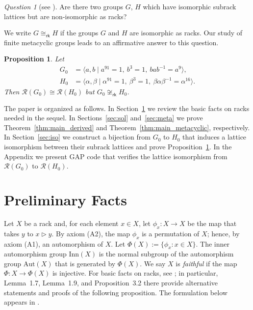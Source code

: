 \documentclass[a4paper,12pt]{article}
\newtheorem{prop}[thm]{Proposition}
\theoremstyle{definition}
\theoremstyle{remark}
\newtheorem*{question}{Question}
\begin{document}
\begin{question}[see {\cite[Question~5.2]{HSW19}}]\label{que:5.2}
  Are there two groups $G$, $H$ which have isomorphic subrack lattices but are non-isomorphic as racks?
\end{question}

We write $G\cong_{\mathsf{rk}}H$ if the groups $G$ and $H$ are isomorphic as racks. Our study of finite metacyclic groups leads to an affirmative answer to this question.

\begin{prop}\label{prop:ex}
  Let
  \begin{align*}
    G_0 &= \langle a,b\mid a^{91} = 1,\ b^3 = 1,\ bab^{-1} = a^9\rangle, \\
    H_0 &= \langle \alpha,\beta\mid \alpha^{91} = 1,\ \beta^3 = 1,\ \beta\alpha\beta^{-1} = \alpha^{16}\rangle.
  \end{align*}
  Then $\mathcal{R}(G_0)\cong \mathcal{R}(H_0)$ but $G_0\not\cong_{\mathsf{rk}}H_0$.
\end{prop}


The paper is organized as follows. In Section~\ref{sec:pre} we review the basic facts on racks needed in the sequel. In Sections~\ref{sec:sol} and~\ref{sec:meta} we prove Theorem~\ref{thm:main_derived} and Theorem~\ref{thm:main_metacyclic}, respectively. In Section~\ref{sec:iso} we construct a bijection from $G_0$ to $H_0$ that induces a lattice isomorphism between their subrack lattices and prove Proposition~\ref{prop:ex}. In the Appendix we present GAP code \cite{GAP4} that verifies the lattice isomorphism from $\mathcal{R}(G_0)$ to $\mathcal{R}(H_0)$.


\section{Preliminary Facts}\label{sec:pre}

Let $X$ be a rack and, for each element $x\in X$, let $\phi_x\colon X\to X$ be the map that takes $y$ to $x\triangleright y$. By axiom (A2), the map $\phi_x$ is a permutation of $X$; hence, by axiom (A1), an automorphism of $X$. Let $\Phi(X) := \{\phi_x\colon x\in X\}$. The inner automorphism group $\mathrm{Inn}(X)$ is the normal subgroup of the automorphism group $\mathrm{Aut}(X)$ that is generated by $\Phi(X)$. We say $X$ is \emph{faithful} if the map $\Phi\colon X\to \Phi(X)$ is injective. For basic facts on racks, see \cite{AG03}; in particular, Lemma~1.7, Lemma~1.9, and Proposition~3.2 there provide alternative statements and proofs of the following proposition. The formulation below appears in \cite[Proposition~2]{Kay25}.
\end{document}
